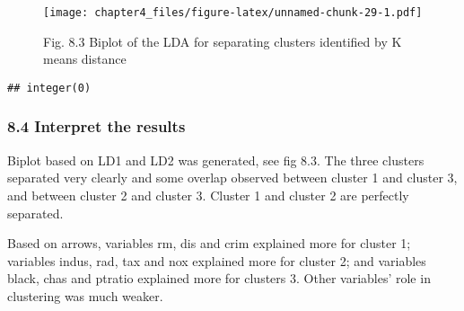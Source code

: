 \documentclass[
]{article}
\begin{document}
\begin{figure}
\centering
\texttt{[image: chapter4\_files/figure-latex/unnamed-chunk-29-1.pdf]}
\caption{Fig. 8.3 Biplot of the LDA for separating clusters identified
by K means distance}
\end{figure}

\begin{verbatim}
## integer(0)
\end{verbatim}

\hypertarget{interpret-the-results-1}{%
\subsubsection{8.4 Interpret the
results}\label{interpret-the-results-1}}

Biplot based on LD1 and LD2 was generated, see fig 8.3. The three
clusters separated very clearly and some overlap observed between
cluster 1 and cluster 3, and between cluster 2 and cluster 3. Cluster 1
and cluster 2 are perfectly separated.

Based on arrows, variables rm, dis and crim explained more for cluster
1; variables indus, rad, tax and nox explained more for cluster 2; and
variables black, chas and ptratio explained more for clusters 3. Other
variables' role in clustering was much weaker.
\end{document}

